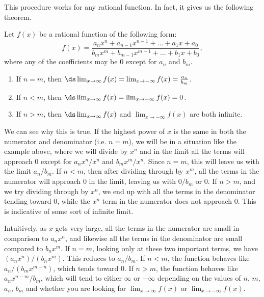 This procedure works for any rational function.  In fact, it gives us the following theorem.

\addtocounter{figure}{1}
{Let $f(x)$ be a rational function of the following form:
$$f(x)=\frac{a_nx^n + a_{n-1}x^{n-1}+\dots + a_1x + a_0}{b_mx^m + b_{m-1}x^{m-1} + \dots + b_1x + b_0},$$
where any of the coefficients may be 0 except for $a_n$ and $b_m$.
\begin{enumerate}
\item If $n=m$, then $\ds\lim_{x\rightarrow\infty} f(x) = \lim_{x\rightarrow-\infty} f(x) = \frac{a_n}{b_m}$.
\item If $n<m$, then $\ds\lim_{x\rightarrow\infty} f(x) = \lim_{x\rightarrow-\infty} f(x) = 0$.
\item If $n>m$, then $\ds\lim_{x\rightarrow\infty} f(x)$ and $\lim_{x\rightarrow-\infty} f(x)$ are both infinite.
\end{enumerate}
}

We can see why this is true.  If the highest power of $x$ is the same in both the numerator and denominator (i.e. $n=m$), we will be in a situation like the example above, where we will divide by $x^n$ and in the limit all the terms will approach 0 except for $a_nx^n/x^n$ and $b_mx^m/x^n$. Since $n=m$, this will leave us with the limit $a_n/b_m$.  If $n<m$, then after dividing through by $x^m$, all the terms in the numerator will approach 0 in the limit, leaving us with $0/b_m$ or 0.  If $n>m$, and we try dividing through by $x^n$, we end up with all the terms in the denominator tending toward 0, while the $x^n$ term in the numerator does not approach 0.  This is indicative of some sort of infinite limit.

Intuitively, as $x$ gets very large, all the terms in the numerator are small in comparison to $a_nx^n$, and likewise all the terms in the denominator are small compared to $b_nx^m$.  If $n=m$, looking only at these two important terms, we have $(a_nx^n)/(b_nx^m)$.  This reduces to $a_n/b_m$.  If $n<m$, the function behaves like $a_n/(b_mx^{m-n})$, which tends toward 0.  If $n>m$, the function behaves like $a_nx^{n-m}/b_m$, which will tend to either $\infty$ or $-\infty$ depending on the values of $n$, $m$, $a_n$, $b_m$ and whether you are looking for $\lim_{x\rightarrow\infty} f(x)$ or $\lim_{x\rightarrow-\infty} f(x)$.

